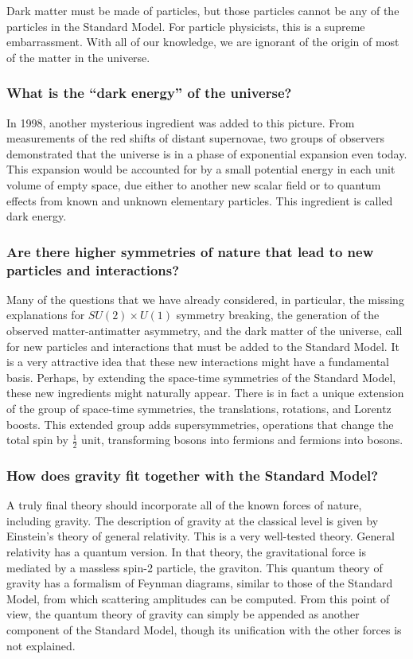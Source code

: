 \documentclass[../../main/main.tex]{subfiles}
\begin{document}
Dark matter must be made of particles, but those particles cannot be any of the particles in the Standard Model. For particle physicists, this is a supreme embarrassment. With all of our knowledge, we are ignorant of the origin of most of the matter in the universe.


\subsubsection{What is the ``dark energy'' of the universe?}
In 1998, another mysterious ingredient was added to this picture. From measurements of the red shifts of distant supernovae, two groups of observers demonstrated that the universe is in a phase of exponential expansion even today. This expansion would be accounted for by a small potential energy in each unit volume of empty space, due either to another new scalar field or to quantum effects from known and unknown elementary particles. This ingredient is called dark energy.


\subsubsection{Are there higher symmetries of nature that lead to new particles and interactions?}
Many of the questions that we have already considered, in particular, the missing explanations for \( SU(2) \times U(1) \) symmetry breaking, the generation of the observed matter-antimatter asymmetry, and the dark matter of the universe, call for new particles and interactions that must be added to the Standard Model. It is a very attractive idea that these new interactions might have a fundamental basis. Perhaps, by extending the space-time symmetries of the Standard Model, these new ingredients might naturally appear. There is in fact a unique extension of the group of space-time symmetries, the translations, rotations, and Lorentz boosts. This extended group adds supersymmetries, operations that change the total spin by \( \frac{1}{2} \) unit, transforming bosons into fermions and fermions into bosons.


\subsubsection{How does gravity fit together with the Standard Model?}
A truly final theory should incorporate all of the known forces of nature, including gravity. The description of gravity at the classical level is given by Einstein's theory of general relativity. This is a very well-tested theory. General relativity has a quantum version. In that theory, the gravitational force is mediated by a massless spin-2 particle, the graviton. This quantum theory of gravity has a formalism of Feynman diagrams, similar to those of the Standard Model, from which scattering amplitudes can be computed. From this point of view, the quantum theory of gravity can simply be appended as another component of the Standard Model, though its unification with the other forces is not explained.
\end{document}
